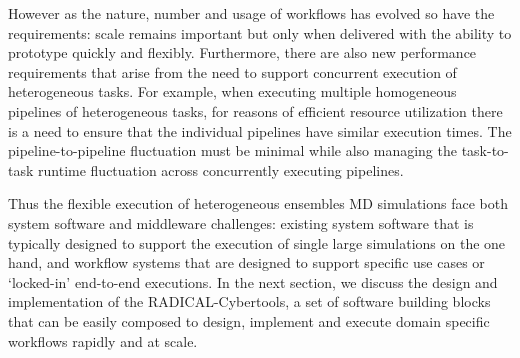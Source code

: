 However as the nature, number and usage of workflows has evolved so have the
requirements: scale remains important but only when delivered with the
ability to prototype quickly and flexibly. Furthermore, there are also new
performance requirements that arise from the need to support concurrent
execution of heterogeneous tasks. For example, when executing multiple
homogeneous pipelines of heterogeneous tasks, for reasons of efficient
resource utilization there is a need to ensure that the individual pipelines
have similar execution times. The pipeline-to-pipeline fluctuation must be
minimal while also managing the task-to-task runtime fluctuation across
concurrently executing pipelines.

Thus the flexible execution of heterogeneous ensembles 
MD simulations face both system software and
middleware challenges: existing system software that is typically designed to
support the execution of single large simulations on the one hand, and
workflow systems that are designed to support specific use cases or
`locked-in' end-to-end executions. %
In the next section, we discuss the design and implementation of the
RADICAL-Cybertools, a set of software building blocks that can be easily
composed to design, implement and execute domain specific workflows rapidly
and at scale.


